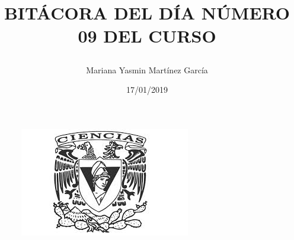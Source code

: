 \documentclass{article}
\title{\Huge\item\color{blue}\textbf{BITÁCORA DEL DÍA NÚMERO 09 DEL CURSO}}
\author{\Large Mariana Yasmin Martínez García}
\date{\Large 17/01/2019}
\begin{document}
\begin{figure}[t]
	\centering
	\includegraphics[width=0.7\linewidth]{Imagenes/1}
	\caption{}
	\label{1}
\end{figure}

	\maketitle
		
	\newpage
	
\end{document}
